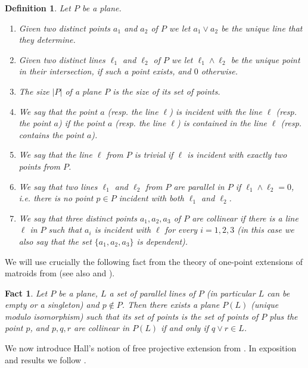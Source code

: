 \documentclass{amsart}
\newtheorem{definition}[theorem]{Definition}
\newtheorem{fact}[theorem]{Fact}
\numberwithin{claimcounter}{theorem}
\begin{document}
	\begin{definition}\label{basic_def} Let $P$ be a plane.
	\begin{enumerate}[(1)]
	\item\label{sup} Given two distinct points $a_1$ and $a_2$ of $P$ we let $a_1 \vee a_2$ be the unique line that they determine.
	\item\label{inf} Given two distinct lines $\ell_1$ and $\ell_2$ of $P$ we let $\ell_1 \wedge \ell_2$ be the unique point in their intersection, if such a point exists, and $0$ otherwise.
	\item The {\em size} $|P|$ of a plane $P$ is the size of its set of points. 
	\item We say that the point $a$ (resp. the line $\ell$) is {\em incident} with the line $\ell$ (resp. the point $a$) if the point $a$ (resp. the line $\ell$) is contained in the line $\ell$ (resp. contains the point $a$).
	\item\label{trivial} We say that the line $\ell$ from $P$ is {\em trivial} if $\ell$ is incident with exactly two points from $P$.
	\item We say that two lines $\ell_1$ and $\ell_2$ from $P$ are {\em parallel} in $P$ if $\ell_1 \wedge \ell_2 = 0$, i.e. there is no point $p \in P$ incident with both $\ell_1$ and $\ell_2$. 
	\item We say that three distinct points $a_1, a_2, a_3$ of $P$ are {\em collinear} if there is a line $\ell$ in $P$ such that $a_i$ is incident with $\ell$ for every $i = 1, 2, 3$ (in this case we also say that the set $\{a_1, a_2, a_3\}$ is dependent).
\end{enumerate}
\end{definition}
	
	We will use crucially the following fact from the theory of one-point extensions of matroids from \cite{crapo} (see also \cite[Chapter 10]{rota} and \cite[Theorem 2.12]{paolini&hyttinen}).

	\begin{fact}\label{fact} Let $P$ be a plane, $L$ a set of parallel lines of $P$ (in particular $L$ can be empty or a singleton) and $p \not\in P$. Then there exists a plane $P(L)$ (unique modulo isomorphism) such that its set of points is the set of points of $P$ plus the point $p$, and $p, q, r$ are collinear in $P(L)$ if and only if $q \vee r \in L$.
\end{fact}	

	We now introduce Hall's notion of free projective extension from \cite{hall_proj}. In exposition and results we follow \cite[Chapter XI]{piper}.
\end{document}
